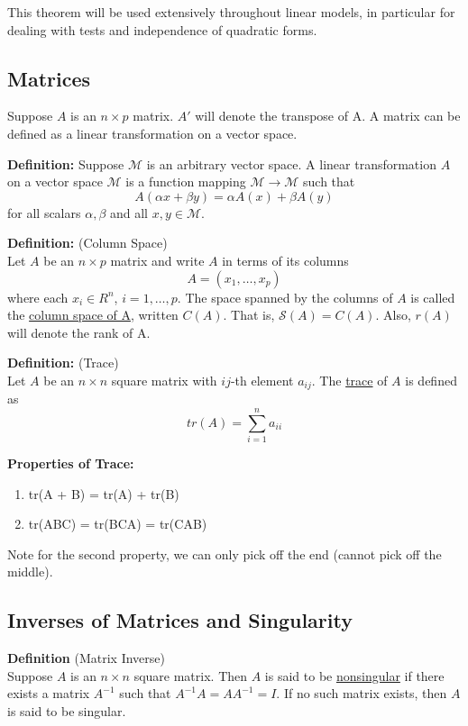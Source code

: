 \documentclass[12pt]{article}
\numberwithin{equation}{section}
\begin{document}
This theorem will be used extensively throughout linear models, in particular for dealing with tests and independence of quadratic forms.

\subsection{Matrices}
Suppose $A$ is an $n \times p$ matrix. $A'$ will denote the transpose of A. A matrix can be defined as a linear transformation on a vector space.

\textbf{Definition:} Suppose $\mathcal{M}$ is an arbitrary vector space. A linear transformation $A$ on a vector space $\mathcal{M}$ is a function mapping $\mathcal{M} \to \mathcal{M}$ such that
\begin{equation*}
  A(\alpha x + \beta y) = \alpha A(x) + \beta A(y)
\end{equation*}
for all scalars $\alpha, \beta$ and all $x, y \in \mathcal{M}$.

\textbf{Definition:} (Column Space) \\
Let $A$ be an $n \times p$ matrix and write $A$ in terms of its columns 
\begin{equation*}
  A = (x_1, \ldots, x_p)
\end{equation*}
where each $x_i \in R^n$, $i = 1, \ldots, p$. The space spanned by the columns of $A$ is called the \underline{column space of A}, written $C(A)$. That is, $\mathcal{S}(A) = C(A)$. Also, $r(A)$ will denote the rank of A.

\textbf{Definition:} (Trace) \\
Let $A$ be an $n \times n$ square matrix with $ij$-th element $a_{ij}$. The \underline{trace} of $A$ is defined as
\begin{equation*}
  tr(A) = \sum_{i = 1}^n a_{ii}
\end{equation*}

\textbf{Properties of Trace:} \\
\begin{enumerate}
  \item tr(A + B) = tr(A) + tr(B) 
  \item tr(ABC) = tr(BCA) = tr(CAB)
\end{enumerate}
Note for the second property, we can only pick off the end (cannot pick off the middle).

\subsection{Inverses of Matrices and Singularity}
\textbf{Definition} (Matrix Inverse) \\
Suppose $A$ is an $n \times n$ square matrix. Then $A$ is said to be \underline{nonsingular} if there exists a matrix $A^{-1}$ such that $A^{-1} A = A A^{-1} = I$. If no such matrix exists, then $A$ is said to be singular.
\end{document}
